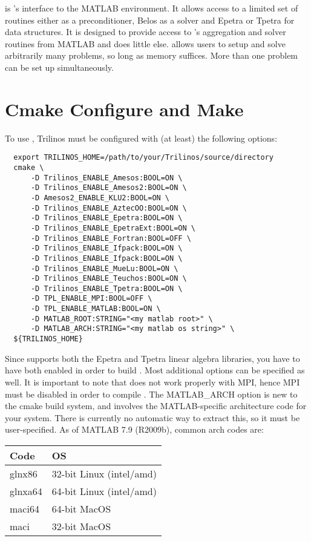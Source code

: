 \muemex is \muelu's interface to the MATLAB environment. It allows access
to a limited set of routines either \muelu as a preconditioner,
Belos as a solver and Epetra or Tpetra for data structures.
It is designed to provide access to \muelu's aggregation and
solver routines from MATLAB and does little else. \muemex allows users to
setup and solve arbitrarily many problems, so long as memory suffices.
More than one problem can be set up simultaneously.

\section{Cmake Configure and Make}\label{sec:muemex:cmake}
To use \muemex, Trilinos must be configured with (at least) the
following options:

\begin{lstlisting}
  export TRILINOS_HOME=/path/to/your/Trilinos/source/directory
  cmake \
      -D Trilinos_ENABLE_Amesos:BOOL=ON \
      -D Trilinos_ENABLE_Amesos2:BOOL=ON \
      -D Amesos2_ENABLE_KLU2:BOOL=ON \
      -D Trilinos_ENABLE_AztecOO:BOOL=ON \
      -D Trilinos_ENABLE_Epetra:BOOL=ON \
      -D Trilinos_ENABLE_EpetraExt:BOOL=ON \
      -D Trilinos_ENABLE_Fortran:BOOL=OFF \
      -D Trilinos_ENABLE_Ifpack:BOOL=ON \
      -D Trilinos_ENABLE_Ifpack:BOOL=ON \
      -D Trilinos_ENABLE_MueLu:BOOL=ON \
      -D Trilinos_ENABLE_Teuchos:BOOL=ON \
      -D Trilinos_ENABLE_Tpetra:BOOL=ON \
      -D TPL_ENABLE_MPI:BOOL=OFF \
      -D TPL_ENABLE_MATLAB:BOOL=ON \
      -D MATLAB_ROOT:STRING="<my matlab root>" \
      -D MATLAB_ARCH:STRING="<my matlab os string>" \
  ${TRILINOS_HOME}
\end{lstlisting}

Since \muemex supports both the Epetra and Tpetra linear algebra
libraries, you have to have both enabled in order to build \muemex.
Most additional options can be specified as well.  It is important to
note that \muemex does not work properly with MPI, hence MPI must be
disabled in order to compile \muemex.  The MATLAB\_ARCH option is new to
the cmake build system, and involves the MATLAB-specific architecture
code for your system.  There is currently no automatic way to extract
this, so it must be user-specified.  As of MATLAB 7.9 (R2009b), common
arch codes are:
\begin{center}
\begin{tabular}{l|l}
Code& OS\\
\hline
glnx86& 32-bit Linux (intel/amd)\\
glnxa64& 64-bit Linux (intel/amd)\\
maci64& 64-bit MacOS\\
maci& 32-bit MacOS\\
\end{tabular}
\end{center}

